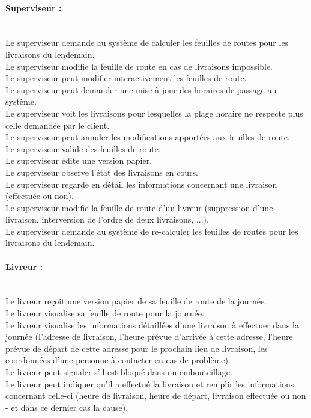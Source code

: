 \documentclass{report}
\begin{document}
\paragraph{Superviseur :}
~~\\
Le superviseur demande au système de calculer les feuilles de routes pour les livraisons du lendemain.\\
Le superviseur modifie la feuille de route en cas de livraisons impossible.\\
Le superviseur peut modifier interactivement les feuilles de route.\\
Le superviseur peut demander une mise à jour des horaires de passage au système.\\
Le superviseur voit les livraisons pour lesquelles la plage horaire ne respecte plus celle demandée par le client.\\
Le superviseur peut annuler les modifications apportées aux feuilles de route.\\
Le superviseur valide des feuilles de route.\\
Le superviseur édite une version papier.\\
Le superviseur observe l’état des livraisons en cours. \\
Le superviseur regarde en détail les informations concernant une livraison (effectuée ou non).\\
Le superviseur modifie la feuille de route d’un livreur (suppression d’une livraison, interversion de l’ordre de deux livraisons, ...).\\
Le superviseur demande au système de re-calculer les feuilles de routes pour les livraisons du lendemain.\\

\paragraph{Livreur :}
~~\\
Le livreur reçoit une version papier de sa feuille de route de la journée.\\
Le livreur visualise sa feuille de route pour la journée.\\
Le livreur visualise les informations détaillées d’une livraison à effectuer dans la journée (l’adresse de livraison, l’heure prévue d’arrivée à cette adresse, l’heure prévue de départ de cette adresse pour le prochain lieu de livraison, les coordonnées d’une personne à contacter en cas de problème).\\
Le livreur peut signaler s’il est bloqué dans un embouteillage.\\
Le livreur peut indiquer qu’il a effectué la livraison et remplir les informations concernant celle-ci (heure de livraison, heure de départ, livraison effectuée ou non - et dans ce dernier cas la cause).\\
\end{document}
